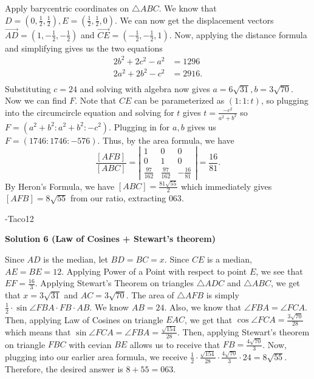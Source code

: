 \begin{enumerate}
Apply barycentric coordinates on $\triangle ABC$. We know that $D=\left(0, \frac{1}{2}, \frac{1}{2}\right), E=\left(\frac{1}{2}, \frac{1}{2}, 0\right)$. We can now get the displacement vectors $\overrightarrow{AD} = \left(1, -\frac{1}{2}, -\frac{1}{2}\right)$ and $\overrightarrow{CE}=\left(-\frac{1}{2}, -\frac{1}{2}, 1\right)$. Now, applying the distance formula and simplifying gives us the two equations
 \begin{align*} 2b^2+2c^2-a^2&=1296 \\ 2a^2+2b^2-c^2&=2916. \\ \end{align*}
Substituting $c=24$ and solving with algebra now gives $a=6\sqrt{31}, b=3\sqrt{70}$. Now we can find $F$. Note that $CE$ can be parameterized as $(1:1:t)$, so plugging into the circumcircle equation and solving for $t$ gives $t=\frac{-c^2}{a^2+b^2}$ so $F=(a^2+b^2:a^2+b^2:-c^2)$. Plugging in for $a,b$ gives us $F=(1746:1746:-576)$. Thus, by the area formula, we have
 \[\frac{[AFB]}{[ABC]}= \left|\begin{matrix} 1 & 0 & 0 \\ 0 & 1 & 0 \\ \frac{97}{162} & \frac{97}{162} & -\frac{16}{81} \end{matrix}\right|=\frac{16}{81}.\]By Heron's Formula, we have $[ABC]=\frac{81\sqrt{55}}{2}$ which immediately gives $[AFB]=8\sqrt{55}$ from our ratio, extracting $\boxed{063}$.

 -Taco12

 



\textbf{Solution 6 (Law of Cosines + Stewart's theorem)}

Since $AD$ is the median, let $BD=BC=x$. Since $CE$ is a median, $AE=BE=12$. Applying Power of a Point with respect to point $E$, we see that $EF=\frac{16}{3}$. Applying Stewart's Theorem on triangles $\triangle ADC$ and $\triangle ABC$, we get that $x=3\sqrt{31}$ and $AC=3\sqrt{70}$. The area of $\triangle AFB$ is simply $\frac{1}{2} \cdot \sin{\angle FBA}\cdot FB\cdot AB$. We know $AB=24$. Also, we know that $\angle FBA = \angle FCA$. Then, applying Law of Cosines on triangle $EAC$, we get that $\cos{\angle FCA}=\frac{3\sqrt{70}}{28}$ which means that $\sin{\angle FCA=\angle FBA}=\frac{\sqrt{154}}{28}$. Then, applying Stewart's theorem on triangle $FBC$ with cevian $BE$ allows us to receive that $FB=\frac{4\sqrt{70}}{3}$. Now, plugging into our earlier area formula, we receive $\frac{1}{2} \cdot \frac{\sqrt{154}}{28} \cdot \frac{4\sqrt{70}}{3} \cdot 24 = 8\sqrt{55}.$ Therefore, the desired answer is $8+55=\boxed{063}$.


\end{enumerate}
